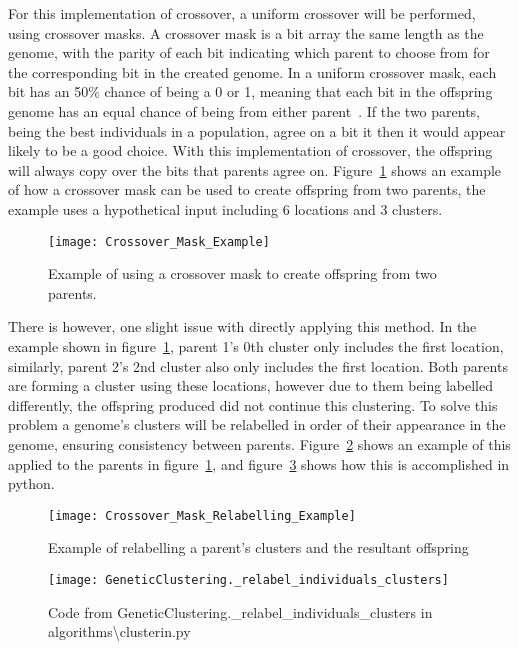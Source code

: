 \noindent
For this implementation of crossover, a uniform crossover will be performed, using crossover masks.
A crossover mask is a bit array the same length as the genome, with the parity of each bit indicating which parent
to choose from for the corresponding bit in the created genome.
In a uniform crossover mask, each bit has an 50\% chance of being a 0 or 1, meaning that each bit in the offspring
genome has an equal chance of being from either parent~\parencite{syswerda1989uniform}.
If the two parents, being the best individuals in a population, agree on a bit it then it would appear likely to be a
good choice.
With this implementation of crossover, the offspring will always copy over the bits that parents agree on.
Figure~\ref{fig:Crossover_Mask_Example} shows an example of how a crossover mask can be used to create offspring from
two parents, the example uses a hypothetical input including 6 locations and 3 clusters.
\begin{figure}[H]
    \centering
    \texttt{[image: Crossover\_Mask\_Example]}
    \caption{Example of using a crossover mask to create offspring from two parents.}
    \label{fig:Crossover_Mask_Example}
\end{figure}

\noindent
There is however, one slight issue with directly applying this method.
In the example shown in figure~\ref{fig:Crossover_Mask_Example}, parent 1's 0th cluster only includes the first
location, similarly, parent 2's 2nd cluster also only includes the first location.
Both parents are forming a cluster using these locations, however due to them being labelled differently, the
offspring produced did not continue this clustering.
To solve this problem a genome's clusters will be relabelled in order of their appearance in the genome, ensuring
consistency between parents.
Figure~\ref{fig:Crossover_Mask_Relabelling_Example} shows an example of this applied to the parents in figure~\ref{fig:Crossover_Mask_Example},
and figure~\ref{fig:GeneticClustering._relabel_individuals_clusters} shows how this is accomplished in python.
\begin{figure}[H]
    \centering
    \texttt{[image: Crossover\_Mask\_Relabelling\_Example]}
    \caption{Example of relabelling a parent's clusters and the resultant offspring}
    \label{fig:Crossover_Mask_Relabelling_Example}
\end{figure}
\begin{figure}[H]
    \centering
    \texttt{[image: GeneticClustering.\_relabel\_individuals\_clusters]}
    \caption{Code from GeneticClustering.\_relabel\_individuals\_clusters in algorithms\textbackslash clusterin.py}
    \label{fig:GeneticClustering._relabel_individuals_clusters}
\end{figure}

